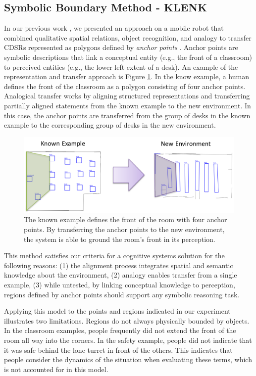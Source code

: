\documentclass[11pt,letterpaper]{article}
\begin{document}
\subsection{Symbolic Boundary Method - KLENK}
In our previous work \cite{Hawes:2012}, we presented an approach on a mobile robot that combined qualitative spatial relations, object recognition, and analogy to transfer CDSRs represented as polygons defined by \textit{anchor points} \cite{DBLP:journals/jetai/KlenkFTK11}.  Anchor points are symbolic descriptions that link a conceptual entity (e.g., the front of a classroom) to perceived entities (e.g., the lower left extent of a desk).  An example of the representation and transfer approach is Figure \ref{fig:anchor-point-transfer}.  In the know example, a human defines the front of the classroom as a polygon consisting of four anchor points.  Analogical transfer works by aligning structured representations and transferring partially aligned statements from the known example to the new environment.  In this case, the anchor points are transferred from the group of desks in the known example to the corresponding group of desks in the new environment. 

\begin{figure}
  \includegraphics[width=\columnwidth]{figures/classroom-transfer.png}
  \caption{The known example defines the front of the room with four anchor points.  By transferring the anchor points to the new environment, the system is able to ground the room's front in its perception.}
  \label{fig:anchor-point-transfer}
\end{figure}

This method satisfies our criteria for a cognitive systems solution for the following reasons: (1) the alignment process integrates spatial and semantic knowledge about the environment, (2) analogy enables transfer from a single example, (3) while untested, by linking conceptual knowledge to perception, regions defined by anchor points should support any symbolic reasoning task.
 
Applying this model to the points and regions indicated in our experiment illustrates two limitations.  Regions do not always physically bounded by objects.  In the classroom examples, people frequently did not extend the front of the room all way into the corners.  In the safety example, people did not indicate that it was safe behind the lone turret in front of the others.  This indicates that people consider the dynamics of the situation when evaluating these terms, which is not accounted for in this model.
\end{document}
